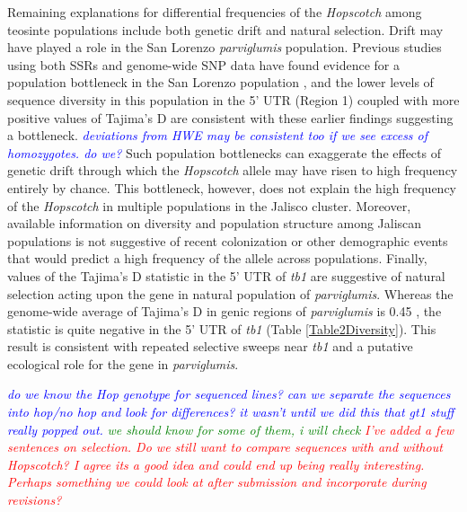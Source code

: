 \documentclass[11pt]{article}
\newcommand{\jri}[1]{\textcolor{blue}{ \emph{\scriptsize  #1}} }
\newcommand{\mbh}[1]{\textcolor{red}{ \emph{\scriptsize  #1}} }
\newcommand{\lev}[1]{\textcolor{green}{\emph{\scriptsize #1}} }
\begin{document}
\begin{linenumbers}
\begin{flushleft}
Remaining explanations for differential frequencies of the \emph{Hopscotch} among teosinte populations include both genetic drift and natural selection.  Drift may have played a role in the San Lorenzo \emph{parviglumis} population. Previous studies using both SSRs and genome-wide SNP data have found evidence for a population bottleneck in the San Lorenzo population \citep{Hufford2010, Pyhajarvi2013}, and the lower levels of sequence diversity in this population in the 5' UTR (Region 1) coupled with more positive values of Tajima's D are consistent with these earlier findings suggesting a bottleneck. \jri{deviations from HWE may be consistent too if we see excess of homozygotes. do we?} Such population bottlenecks can exaggerate the effects of genetic drift through which the \emph{Hopscotch} allele may have risen to high frequency entirely by chance. This bottleneck, however, does not explain the high frequency of the \emph{Hopscotch} in multiple populations in the Jalisco cluster.  Moreover, available information on diversity and population structure among Jaliscan populations \citep{Hufford2010, Pyhajarvi2013} is not suggestive of recent colonization or other demographic events that would predict a high frequency of the allele across populations.  Finally, values of the Tajima's D statistic in the 5' UTR of \emph{tb1} are suggestive of natural selection acting upon the gene in natural population of \emph{parviglumis}.  Whereas the genome-wide average of Tajima's D in genic regions of \emph{parviglumis} is 0.45 \citep{Hufford2012b}, the statistic is quite negative in the 5' UTR of \emph{tb1} (Table \ref{Table2Diversity}). This result is consistent with repeated selective sweeps near \emph{tb1} and a putative ecological role for the gene in \emph{parviglumis}.

\jri{do we know the Hop genotype for sequenced lines? can we separate the sequences into hop/no hop and look for differences? it wasn't until we did this that gt1 stuff really popped out.} \lev{we should know for some of them, i will check} \mbh{I've added a few sentences on selection.  Do we still want to compare sequences with and without \emph{Hopscotch}?  I agree its a good idea and could end up being really interesting.  Perhaps something we could look at after submission and incorporate during revisions?}


\end{flushleft}
\end{linenumbers}
\end{document}
